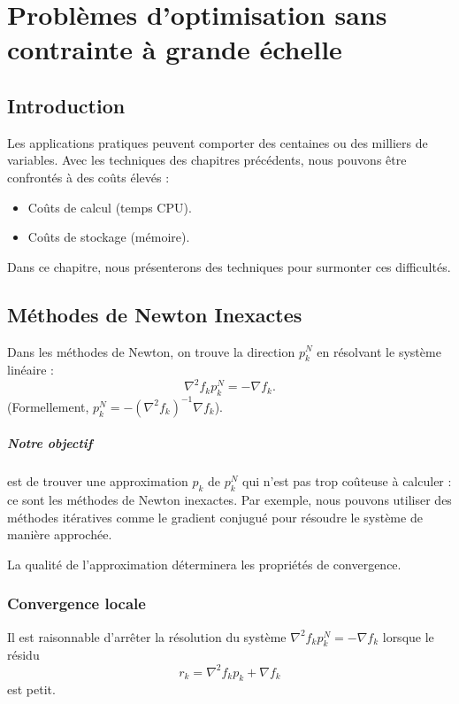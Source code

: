 \chapter{Problèmes d'optimisation sans contrainte à grande échelle}
\label{chap:large-scale}

\section{Introduction}

Les applications pratiques peuvent comporter des centaines ou des milliers de variables.
Avec les techniques des chapitres précédents, nous pouvons être confrontés à des coûts élevés :
\begin{itemize}
    \item Coûts de calcul (temps CPU).
    \item Coûts de stockage (mémoire).
\end{itemize}

Dans ce chapitre, nous présenterons des techniques pour surmonter ces difficultés.

\section{Méthodes de Newton Inexactes}

Dans les méthodes de Newton, on trouve la direction $p_k^N$ en résolvant le système linéaire :
\[
    \nabla^2 f_k p_k^N = - \nabla f_k.
\]
(Formellement, $p_k^N = - (\nabla^2 f_k)^{-1} \nabla f_k$).

\paragraph{Notre objectif} est de trouver une approximation $p_k$ de $p_k^N$ qui n'est pas trop coûteuse à calculer : ce sont les méthodes de Newton inexactes.
Par exemple, nous pouvons utiliser des méthodes itératives comme le gradient conjugué pour résoudre le système de manière approchée.

La qualité de l'approximation déterminera les propriétés de convergence.

\subsection{Convergence locale}

Il est raisonnable d'arrêter la résolution du système $\nabla^2 f_k p_k^N = -\nabla f_k$ lorsque le résidu
\[
    r_k = \nabla^2 f_k p_k + \nabla f_k
\]
est petit.

